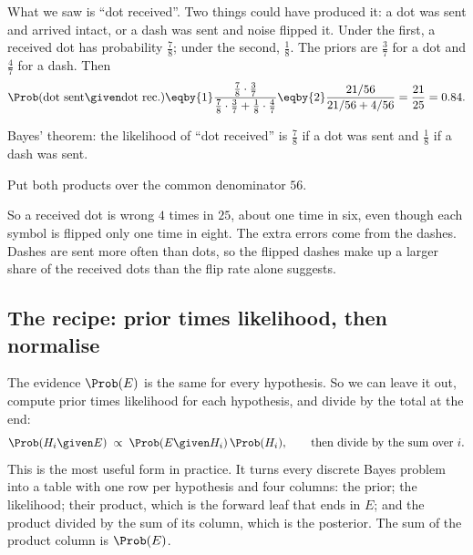 What we saw is ``dot received''. Two things could have produced it: a dot was
sent and arrived intact, or a dash was sent and noise flipped it. Under the
first, a received dot has probability $\tfrac78$; under the second,
$\tfrac18$. The priors are $\tfrac37$ for a dot and $\tfrac47$ for a dash. Then
\begin{align*}
\Prob(\text{dot sent}\given\text{dot rec.})
\eqby{1}\frac{\tfrac78\cdot\tfrac37}{\tfrac78\cdot\tfrac37+\tfrac18\cdot\tfrac47}
\eqby{2}\frac{21/56}{21/56+4/56}=\frac{21}{25}=0.84 .
\end{align*}
\begin{explain}
  \item Bayes' theorem: the likelihood of ``dot received'' is $\tfrac78$ if a dot
        was sent and $\tfrac18$ if a dash was sent.
  \item Put both products over the common denominator $56$.
\end{explain}
So a received dot is wrong $4$ times in $25$, about one time in six, even though
each symbol is flipped only one time in eight. The extra errors come from the
dashes. Dashes are sent more often than dots, so the flipped dashes make up a
larger share of the received dots than the flip rate alone suggests.

\subsection{The recipe: prior times likelihood, then normalise}

The evidence $\Prob(E)$ is the same for every hypothesis. So we can leave it out,
compute prior times likelihood for each hypothesis, and divide by the total at
the end:
\begin{equation}
\Prob(H_i\given E)\;\propto\;\Prob(E\given H_i)\,\Prob(H_i),
\qquad
\text{then divide by the sum over } i .
\label{1a:eq:bayes-prop}
\end{equation}
This is the most useful form in practice. It turns every discrete Bayes problem
into a table with one row per hypothesis and four columns:
the prior; the likelihood; their product, which is the forward leaf that ends
in $E$; and the product divided by the sum of its column, which is the
posterior. The sum of the product column is $\Prob(E)$.

